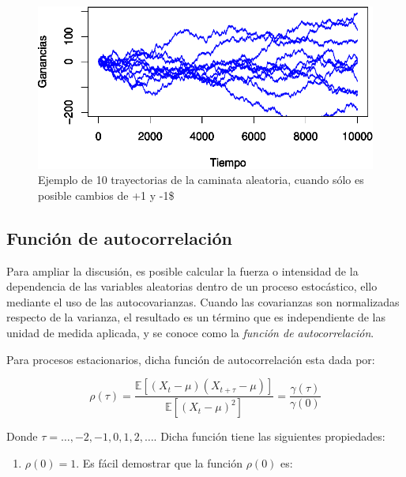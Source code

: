 \documentclass[
  a4paper,
]{article}
\providecommand{\tightlist}{%
  \setlength{\itemsep}{0pt}\setlength{\parskip}{0pt}}\usepackage{longtable,booktabs,array}
\begin{document}
\begin{figure}

\caption{Ejemplo de 10 trayectorias de la caminata aleatoria, cuando
sólo es posible cambios de +1 y -1\$}

{\centering \includegraphics{index_files/figure-pdf/fig31-1.pdf}

}

\end{figure}

\hypertarget{funciuxf3n-de-autocorrelaciuxf3n}{%
\subsection{Función de
autocorrelación}\label{funciuxf3n-de-autocorrelaciuxf3n}}

Para ampliar la discusión, es posible calcular la fuerza o intensidad de
la dependencia de las variables aleatorias dentro de un proceso
estocástico, ello mediante el uso de las autocovarianzas. Cuando las
covarianzas son normalizadas respecto de la varianza, el resultado es un
término que es independiente de las unidad de medida aplicada, y se
conoce como la \textit{función de autocorrelación}.

Para procesos estacionarios, dicha función de autocorrelación esta dada
por:

\[
\rho(\tau) = \frac{\mathbb{E}[(X_t - \mu)(X_{t+\tau} - \mu)]}{\mathbb{E}[(X_t - \mu)^2]} = \frac{\gamma(\tau)}{\gamma(0)} 
\]

Donde \(\tau = \ldots, -2, -1, 0, 1, 2, \ldots\). Dicha función tiene
las siguientes propiedades:

\begin{enumerate}
\def\labelenumi{\arabic{enumi}.}
\tightlist
\item
  \(\rho(0) = 1\). Es fácil demostrar que la función \(\rho(0)\) es:
\end{enumerate}
\end{document}
